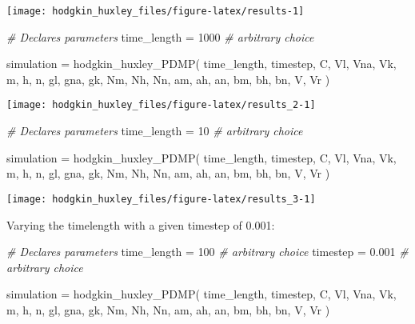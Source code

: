\documentclass[
]{article}
\newenvironment{Shaded}{\begin{snugshade}}{\end{snugshade}}
\newcommand{\CommentTok}[1]{\textcolor[rgb]{0.56,0.35,0.01}{\textit{#1}}}
\newcommand{\DecValTok}[1]{\textcolor[rgb]{0.00,0.00,0.81}{#1}}
\newcommand{\FloatTok}[1]{\textcolor[rgb]{0.00,0.00,0.81}{#1}}
\newcommand{\FunctionTok}[1]{\textcolor[rgb]{0.00,0.00,0.00}{#1}}
\newcommand{\NormalTok}[1]{#1}
\newcommand{\OtherTok}[1]{\textcolor[rgb]{0.56,0.35,0.01}{#1}}
\begin{document}
\texttt{[image: hodgkin\_huxley\_files/figure-latex/results-1]}

\begin{Shaded}
\begin{Highlighting}[]
\CommentTok{\# Declares parameters}
\NormalTok{time\_length }\OtherTok{=} \DecValTok{1000} \CommentTok{\# arbitrary choice}

\NormalTok{simulation }\OtherTok{=} \FunctionTok{hodgkin\_huxley\_PDMP}\NormalTok{(}
\NormalTok{  time\_length, timestep,}
\NormalTok{  C, }
\NormalTok{  Vl, Vna, Vk, }
\NormalTok{  m, h, n,}
\NormalTok{  gl, gna, gk,}
\NormalTok{  Nm, Nh, Nn,}
\NormalTok{  am, ah, an, bm, bh, bn,}
\NormalTok{  V, Vr}
\NormalTok{)}
\end{Highlighting}
\end{Shaded}

\texttt{[image: hodgkin\_huxley\_files/figure-latex/results\_2-1]}

\begin{Shaded}
\begin{Highlighting}[]
\CommentTok{\# Declares parameters}
\NormalTok{time\_length }\OtherTok{=} \DecValTok{10} \CommentTok{\# arbitrary choice}

\NormalTok{simulation }\OtherTok{=} \FunctionTok{hodgkin\_huxley\_PDMP}\NormalTok{(}
\NormalTok{  time\_length, timestep,}
\NormalTok{  C, }
\NormalTok{  Vl, Vna, Vk, }
\NormalTok{  m, h, n,}
\NormalTok{  gl, gna, gk,}
\NormalTok{  Nm, Nh, Nn,}
\NormalTok{  am, ah, an, bm, bh, bn,}
\NormalTok{  V, Vr}
\NormalTok{)}
\end{Highlighting}
\end{Shaded}

\texttt{[image: hodgkin\_huxley\_files/figure-latex/results\_3-1]}

Varying the timelength with a given timestep of 0.001:

\begin{Shaded}
\begin{Highlighting}[]
\CommentTok{\# Declares parameters}
\NormalTok{time\_length }\OtherTok{=} \DecValTok{100}   \CommentTok{\# arbitrary choice}
\NormalTok{timestep    }\OtherTok{=} \FloatTok{0.001} \CommentTok{\# arbitrary choice}

\NormalTok{simulation }\OtherTok{=} \FunctionTok{hodgkin\_huxley\_PDMP}\NormalTok{(}
\NormalTok{  time\_length, timestep,}
\NormalTok{  C, }
\NormalTok{  Vl, Vna, Vk, }
\NormalTok{  m, h, n,}
\NormalTok{  gl, gna, gk,}
\NormalTok{  Nm, Nh, Nn,}
\NormalTok{  am, ah, an, bm, bh, bn,}
\NormalTok{  V, Vr}
\NormalTok{)}
\end{Highlighting}
\end{Shaded}
\end{document}
